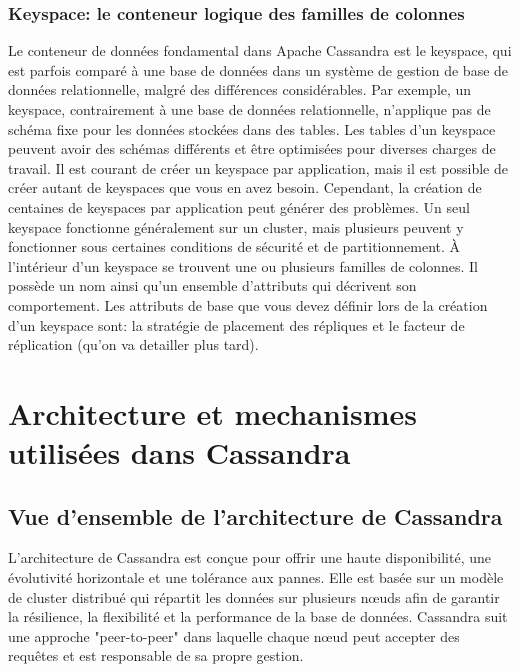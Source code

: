 \documentclass[12pt, letterpaper]{report}
\begin{document}
\subsection{Keyspace: le conteneur logique des familles de colonnes}
Le conteneur de données fondamental dans Apache Cassandra est le keyspace, qui est parfois comparé à une base de données dans un système de gestion de base de données relationnelle, malgré des différences considérables. Par exemple, un keyspace, contrairement à une base de données relationnelle, n'applique pas de schéma fixe pour les données stockées dans des tables. Les tables d'un keyspace peuvent avoir des schémas différents et être optimisées pour diverses charges de travail.
\newline
Il est courant de créer un keyspace par application, mais il est possible de créer autant de keyspaces que vous en avez besoin. Cependant, la création de centaines de keyspaces par application peut générer des problèmes. Un seul keyspace fonctionne généralement sur un cluster, mais plusieurs peuvent y fonctionner sous certaines conditions de sécurité et de partitionnement.
\newline
À l'intérieur d'un keyspace se trouvent une ou plusieurs familles de colonnes. Il possède un nom ainsi qu'un ensemble d'attributs qui décrivent son comportement. Les attributs de base que vous devez définir lors de la création d'un keyspace sont: la stratégie de placement des répliques et le facteur de réplication (qu’on va detailler plus tard).


\chapter{Architecture et mechanismes utilisées dans Cassandra}
\section{Vue d'ensemble de l'architecture de Cassandra}
L'architecture de Cassandra est conçue pour offrir une haute disponibilité, une évolutivité horizontale et une tolérance aux pannes. Elle est basée sur un modèle de cluster distribué qui répartit les données sur plusieurs nœuds afin de garantir la résilience, la flexibilité et la performance de la base de données. Cassandra suit une approche "peer-to-peer" dans laquelle chaque nœud peut accepter des requêtes et est responsable de sa propre gestion.
\end{document}
